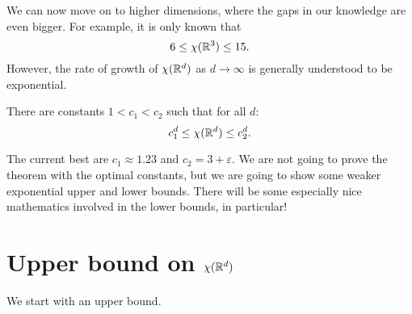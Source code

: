 We can now move on to higher dimensions, where the gaps in our knowledge are even bigger. For example, it is only known that
$$6\leq\chi(\mathbb{R}^3)\leq 15.$$
However, the rate of growth of $\chi(\mathbb{R}^d)$ as $d\to\infty$ is generally understood to be exponential.

\begin{theorem}
There are constants $1<c_1<c_2$ such that for all $d$:
$$c_1^d\leq \chi(\mathbb{R}^d)\leq c_2^d.$$
\end{theorem}
The current best are $c_1\approx 1.23$ and $c_2=3+\varepsilon$. We are not going to prove the theorem with the optimal constants, but we are going to show some weaker exponential upper and lower bounds. There will be some especially nice mathematics involved in the lower bounds, in particular!


\section{Upper bound on $\chi(\mathbb{R}^d)$}

We start with an upper bound.

